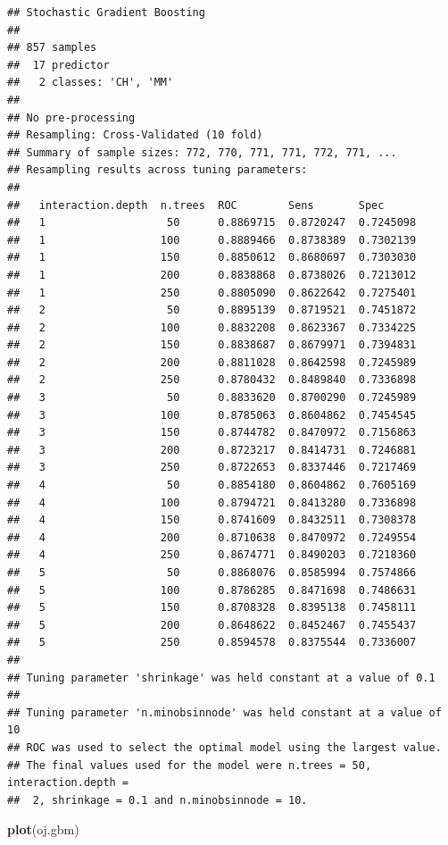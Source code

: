 \documentclass[
]{book}
\newenvironment{Shaded}{\begin{snugshade}}{\end{snugshade}}
\newcommand{\KeywordTok}[1]{\textcolor[rgb]{0.13,0.29,0.53}{\textbf{#1}}}
\newcommand{\NormalTok}[1]{#1}
\begin{document}
\begin{verbatim}
## Stochastic Gradient Boosting 
## 
## 857 samples
##  17 predictor
##   2 classes: 'CH', 'MM' 
## 
## No pre-processing
## Resampling: Cross-Validated (10 fold) 
## Summary of sample sizes: 772, 770, 771, 771, 772, 771, ... 
## Resampling results across tuning parameters:
## 
##   interaction.depth  n.trees  ROC        Sens       Spec     
##   1                   50      0.8869715  0.8720247  0.7245098
##   1                  100      0.8889466  0.8738389  0.7302139
##   1                  150      0.8850612  0.8680697  0.7303030
##   1                  200      0.8838868  0.8738026  0.7213012
##   1                  250      0.8805090  0.8622642  0.7275401
##   2                   50      0.8895139  0.8719521  0.7451872
##   2                  100      0.8832208  0.8623367  0.7334225
##   2                  150      0.8838687  0.8679971  0.7394831
##   2                  200      0.8811028  0.8642598  0.7245989
##   2                  250      0.8780432  0.8489840  0.7336898
##   3                   50      0.8833620  0.8700290  0.7245989
##   3                  100      0.8785063  0.8604862  0.7454545
##   3                  150      0.8744782  0.8470972  0.7156863
##   3                  200      0.8723217  0.8414731  0.7246881
##   3                  250      0.8722653  0.8337446  0.7217469
##   4                   50      0.8854180  0.8604862  0.7605169
##   4                  100      0.8794721  0.8413280  0.7336898
##   4                  150      0.8741609  0.8432511  0.7308378
##   4                  200      0.8710638  0.8470972  0.7249554
##   4                  250      0.8674771  0.8490203  0.7218360
##   5                   50      0.8868076  0.8585994  0.7574866
##   5                  100      0.8786285  0.8471698  0.7486631
##   5                  150      0.8708328  0.8395138  0.7458111
##   5                  200      0.8648622  0.8452467  0.7455437
##   5                  250      0.8594578  0.8375544  0.7336007
## 
## Tuning parameter 'shrinkage' was held constant at a value of 0.1
## 
## Tuning parameter 'n.minobsinnode' was held constant at a value of 10
## ROC was used to select the optimal model using the largest value.
## The final values used for the model were n.trees = 50, interaction.depth =
##  2, shrinkage = 0.1 and n.minobsinnode = 10.
\end{verbatim}

\begin{Shaded}
\begin{Highlighting}[]
\KeywordTok{plot}\NormalTok{(oj.gbm)}
\end{Highlighting}
\end{Shaded}
\end{document}
